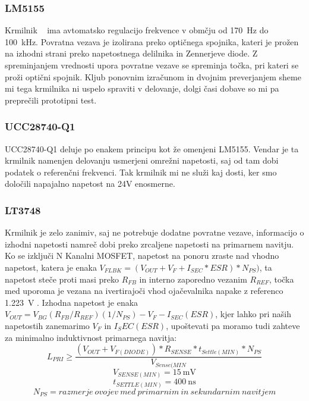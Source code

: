 \documentclass[a4paper,twoside,openright,12pt,slovene]{book}
\begin{document}
	\subsubsection{LM5155} \label{LM5155}
Krmilnik ~\cite{TI:LT5155} ima avtomatsko regulacijo frekvence v obmčju od \SI{170}{\hertz} do \SI{100}{\kilo\hertz}. Povratna vezava je izolirana preko optičnega spojnika, kateri je prožen na izhodni strani preko napetostnega delilnika in Zennerjeve diode. Z spreminjanjem vrednosti upora povratne vezave se spreminja točka, pri kateri se proži optični spojnik. Kljub ponovnim izračunom in dvojnim preverjanjem sheme mi tega krmilnika ni uspelo spraviti v delovanje, dolgi časi dobave so mi pa preprečili prototipni test.


	\subsubsection{UCC28740-Q1} \label{UCC28740-Q1}
UCC28740-Q1 deluje po enakem principu kot že omenjeni LM5155. Vendar je ta krmilnik namenjen delovanju usmerjeni omrežni napetosti, saj od tam dobi podatek o referenčni frekvenci. Tak krmilnik mi ne služi kaj dosti, ker smo določili napajalno napetost na 24V enosmerne. 



	\subsubsection{LT3748} \label{LT3748}
Krmilnik je zelo zanimiv, saj ne potrebuje dodatne povratne vezave, informacijo o izhodni napetosti namreč dobi preko zrcaljene napetosti na primarnem navitju. Ko se izključi N Kanalni MOSFET, napetost na ponoru zraste nad vhodno napetost, katera je enaka \(V_{FLBK} = (V_{OUT} + V_F + I_{SEC} * ESR) * N_{PS}) \), ta napetost steče proti masi preko \(R_{FB}\) in interno zaporedno vezanim \(R_{REF}\), točka med uporoma je vezana na ivertirajoči vhod ojačevalnika napake z referenco \SI{1.223}{\volt} \cite{analog:LT3748}. Izhodna napetost je enaka \(V_{OUT} = V_{BG}(R_{FB} / R_{REF})(1 / N_{PS}) - V_F - I_{SEC} (ESR)\), kjer lahko pri naših napetostih zanemarimo \(V_F\) in \(I_SEC (ESR)\), upoštevati pa moramo tudi zahteve za minimalno induktivnost primarnega navitja:
\[L_{PRI} \geq \frac{(V_{OUT}+V_{F(DIODE)}) * R_{SENSE} * t_{Settle(MIN)} * N_{PS}}{V_{Sense(MIN}}\]
\[V_{SENSE(MIN)}=\SI{15}{\milli\volt}\]
\[t_{SETTLE(MIN)}=\SI{400}{\nano\second}\]
\[N_{PS}=razmerje \: ovojev \: med \: primarnim \: in \: sekundarnim \: navitjem \]
\end{document}
